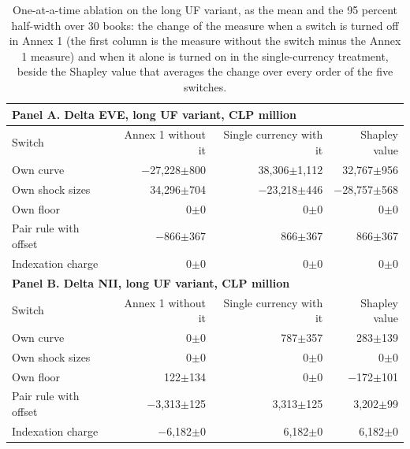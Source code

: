 \begin{table}[htbp]
\centering
\footnotesize
\setlength{\tabcolsep}{3.5pt}
\caption{One-at-a-time ablation on the long UF variant, as the mean and the 95 percent half-width over 30 books: the change of the measure when a switch is turned off in Annex 1 (the first column is the measure without the switch minus the Annex 1 measure) and when it alone is turned on in the single-currency treatment, beside the Shapley value that averages the change over every order of the five switches.}
\label{tab:ablation}
\begin{tabular}{lrrr}
\toprule
\multicolumn{4}{l}{\textbf{Panel A. Delta EVE, long UF variant, CLP million}} \\
\midrule
Switch & Annex 1 without it & Single currency with it & Shapley value \\
\midrule
Own curve & $-$27{,}228$\pm$800 & 38{,}306$\pm$1{,}112 & 32{,}767$\pm$956 \\
Own shock sizes & 34{,}296$\pm$704 & $-$23{,}218$\pm$446 & $-$28{,}757$\pm$568 \\
Own floor & 0$\pm$0 & 0$\pm$0 & 0$\pm$0 \\
Pair rule with offset & $-$866$\pm$367 & 866$\pm$367 & 866$\pm$367 \\
Indexation charge & 0$\pm$0 & 0$\pm$0 & 0$\pm$0 \\
\midrule
\multicolumn{4}{l}{\textbf{Panel B. Delta NII, long UF variant, CLP million}} \\
\midrule
Switch & Annex 1 without it & Single currency with it & Shapley value \\
\midrule
Own curve & 0$\pm$0 & 787$\pm$357 & 283$\pm$139 \\
Own shock sizes & 0$\pm$0 & 0$\pm$0 & 0$\pm$0 \\
Own floor & 122$\pm$134 & 0$\pm$0 & $-$172$\pm$101 \\
Pair rule with offset & $-$3{,}313$\pm$125 & 3{,}313$\pm$125 & 3{,}202$\pm$99 \\
Indexation charge & $-$6{,}182$\pm$0 & 6{,}182$\pm$0 & 6{,}182$\pm$0 \\
\bottomrule
\end{tabular}
\end{table}
